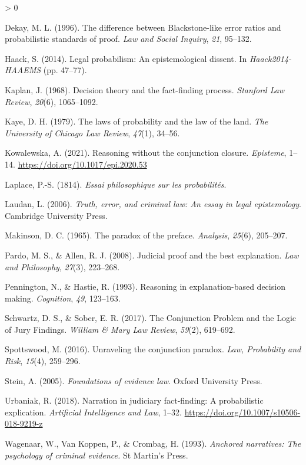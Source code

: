 \documentclass[
  10pt,
  dvipsnames,enabledeprecatedfontcommands]{scrartcl}
\newlength{\cslhangindent}
\newenvironment{CSLReferences}[2] %
 {%
  \setlength{\parindent}{0pt}
  \ifodd #1 \everypar{\setlength{\hangindent}{\cslhangindent}}\ignorespaces\fi
  \ifnum #2 > 0
  \setlength{\parskip}{#2\baselineskip}
  \fi
 }%
 {}
\begin{document}
\begin{CSLReferences}{1}{0}
\leavevmode\hypertarget{ref-Dekay1996}{}%
Dekay, M. L. (1996). The difference between {B}lackstone-like error
ratios and probabilistic standards of proof. \emph{Law and Social
Inquiry}, \emph{21}, 95--132.

\leavevmode\hypertarget{ref-haack2011legal}{}%
Haack, S. (2014). Legal probabilism: An epistemological dissent. In
\emph{{Haack2014-HAAEMS}} (pp. 47--77).

\leavevmode\hypertarget{ref-Kaplan1968decision}{}%
Kaplan, J. (1968). Decision theory and the fact-finding process.
\emph{Stanford Law Review}, \emph{20}(6), 1065--1092.

\leavevmode\hypertarget{ref-kaye79}{}%
Kaye, D. H. (1979). The laws of probability and the law of the land.
\emph{The University of Chicago Law Review}, \emph{47}(1), 34--56.

\leavevmode\hypertarget{ref-Kowalewska2021conjunction}{}%
Kowalewska, A. (2021). Reasoning without the conjunction closure.
\emph{Episteme}, 1--14. \url{https://doi.org/10.1017/epi.2020.53}

\leavevmode\hypertarget{ref-Laplace1814}{}%
Laplace, P.-S. (1814). \emph{Essai philosophique sur les probabilités}.

\leavevmode\hypertarget{ref-laudan2006truth}{}%
Laudan, L. (2006). \emph{Truth, error, and criminal law: An essay in
legal epistemology}. Cambridge University Press.

\leavevmode\hypertarget{ref-Makinson1965-MAKTPO-2}{}%
Makinson, D. C. (1965). The paradox of the preface. \emph{Analysis},
\emph{25}(6), 205--207.

\leavevmode\hypertarget{ref-Pardo2008judicial}{}%
Pardo, M. S., \& Allen, R. J. (2008). Judicial proof and the best
explanation. \emph{Law and Philosophy}, \emph{27}(3), 223--268.

\leavevmode\hypertarget{ref-penn1993}{}%
Pennington, N., \& Hastie, R. (1993). Reasoning in explanation-based
decision making. \emph{Cognition}, \emph{49}, 123--163.

\leavevmode\hypertarget{ref-schwartz2017ConjunctionProblemLogic}{}%
Schwartz, D. S., \& Sober, E. R. (2017). The {Conjunction Problem} and
the {Logic} of {Jury Findings}. \emph{William \& Mary Law Review},
\emph{59}(2), 619--692.

\leavevmode\hypertarget{ref-spottswood2016}{}%
Spottswood, M. (2016). Unraveling the conjunction paradox. \emph{Law,
Probability and Risk}, \emph{15}(4), 259--296.

\leavevmode\hypertarget{ref-Stein05}{}%
Stein, A. (2005). \emph{Foundations of evidence law}. Oxford University
Press.

\leavevmode\hypertarget{ref-urbaniak2018narration}{}%
Urbaniak, R. (2018). Narration in judiciary fact-finding: A
probabilistic explication. \emph{Artificial Intelligence and Law},
1--32. \url{https://doi.org/10.1007/s10506-018-9219-z}

\leavevmode\hypertarget{ref-wagenaar1993anchored}{}%
Wagenaar, W., Van Koppen, P., \& Crombag, H. (1993). \emph{Anchored
narratives: The psychology of criminal evidence.} St Martin's Press.

\end{CSLReferences}
\end{document}
